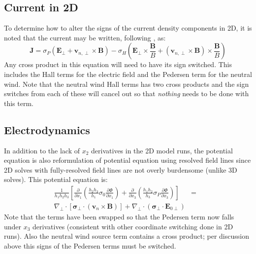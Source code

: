 \documentclass[11pt,letterpaper]{article}
\begin{document}
\subsection{Current in 2D}

To determine how to alter the signs of the current density components in 2D, it is noted that the current may be written, following \citet[][ Ch. 5]{Schunk:2009}, as:  
\begin{equation}
\mathbf{J} = \sigma_P \left( \mathbf{E}_\perp + \mathbf{v}_{n,\perp} \times \mathbf{B} \right) - \sigma_H \left( \mathbf{E}_\perp \times \frac{\mathbf{B}}{B} + \left( \mathbf{v}_{n,\perp} \times \mathbf{B} \right) \times \frac{\mathbf{B}}{B} \right) 
\end{equation}
Any cross product in this equation will need to have its sign switched.  This includes the Hall terms for the electric field and the Pedersen term for the neutral wind.  Note that the neutral wind Hall terms has two cross products and the sign switches from each of these will cancel out so that \emph{nothing} needs to be done with this term.  


\subsection{Electrodynamics}

In addition to the lack of $x_2$ derivatives in the 2D model runs, the potential equation is also reformulation of potential equation using resolved field lines since 2D solves with fully-resolved field lines are not overly burdensome (unlike 3D solves).  This potential equation is:  
\begin{eqnarray}
\frac{1}{h_1 h_2 h_3} \left[ \frac{\partial}{\partial x_1} \left( \frac{h_2 h_3}{h_1} \sigma_0 \frac{\partial \Phi}{\partial x_1} \right) + \frac{\partial}{\partial x_3} \left( \frac{h_1 h_2}{h_3} \sigma_P \frac{\partial \Phi}{\partial x_3} \right) \right]  &=& \nonumber \\ \nabla_\perp \cdot \left[ \boldsymbol{\sigma}_\perp \cdot \left( \mathbf{v}_n \times \mathbf{B} \right) \right] + \nabla_\perp \cdot \left( \boldsymbol{\sigma}_\perp \cdot \mathbf{E}_{0\perp} \right) \label{eqn:potnonEFL}
\end{eqnarray}
Note that the terms have been swapped so that the Pedersen term now falls under $x_3$ derivatives (consistent with other coordinate switching done in 2D runs).  Also the neutral wind source term contains a cross product; per discussion above this signs of the Pedersen terms must be switched.
\end{document}
